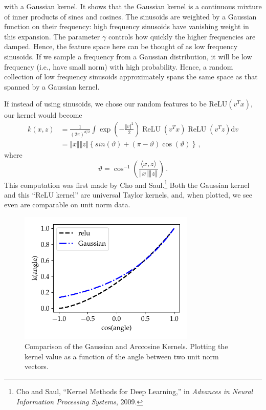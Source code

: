 \documentclass{tufte-book}
\begin{document}
with a Gaussian kernel. It shows that the Gaussian kernel is a
continuous mixture of inner products of sines and cosines. The sinusoids
are weighted by a Gaussian function on their frequency: high frequency
sinusoids have vanishing weight in this expansion. The parameter
\(\gamma\) controls how quickly the higher frequencies are damped.
Hence, the feature space here can be thought of as low frequency
sinusoids. If we sample a frequency from a Gaussian distribution, it
will be low frequency (i.e., have small norm) with high probability.
Hence, a random collection of low frequency sinusoids approximately
spans the same space as that spanned by a Gaussian kernel.

If instead of using sinusoids, we chose our random features to be
\(\mathrm{ReLU}(v^Tx)\), our kernel would become \[
\begin{aligned}
    k(x,z)
    &= \frac{1}{(2 \pi)^{d/2}}\int \exp \left(-\frac{ \Vert v\Vert^2}{2}\right)\operatorname{ReLU}(v^T x)\operatorname{ReLU}(v^T z) \mathrm{d} v\\
    &= \Vert x\Vert \Vert z\Vert \left\{sin(\vartheta) + (\pi-\vartheta) \cos(\vartheta)\right\}\,,
\end{aligned}
\] where \[
        \vartheta = \cos^{-1} \left(\frac{\langle x, z \rangle}{\Vert x \Vert \Vert z \Vert}\right)\,.
\] This computation was first made by Cho and Saul.\footnote{Cho and
  Saul, {``Kernel Methods for Deep Learning,''} in \emph{Advances in
  Neural Information Processing Systems}, 2009.} Both the Gaussian
kernel and this ``ReLU kernel'' are universal Taylor kernels, and, when
plotted, we see even are comparable on unit norm data.

\begin{figure}
\centering
\includegraphics[width=0.75\textwidth,height=\textheight]{assets/kernel_compare}
\caption{Comparison of the Gaussian and Arccosine Kernels. Plotting the
kernel value as a function of the angle between two unit norm vectors.}
\end{figure}
\end{document}
